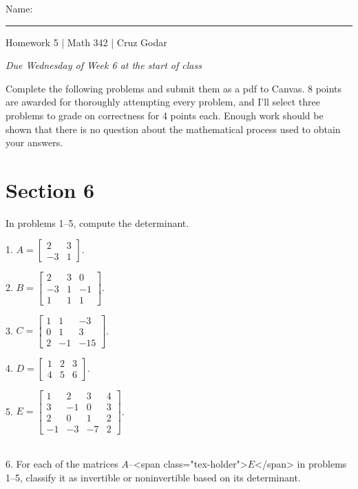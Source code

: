 \documentclass{article}
\begin{document}
\Large Name: \rule{2in}{0.15mm} \hfill Homework 5 | Math 342 | Cruz Godar \vspace{4pt} \normalsize

\textit{Due Wednesday of Week 6 at the start of class}

Complete the following problems and submit them as a pdf to Canvas. 8 points are awarded for thoroughly attempting every problem, and I'll select three problems to grade on correctness for 4 points each. Enough work should be shown that there is no question about the mathematical process used to obtain your answers.

\section{Section 6}

In problems 1--5, compute the determinant.

1. $\displaystyle A = \left[\begin{array}{cc} 2& 3 \\ -3& 1 \end{array}\right]$.

2. $\displaystyle B = \left[\begin{array}{ccc} 2& 3& 0 \\ -3& 1& -1 \\ 1& 1& 1 \end{array}\right]$.

3. $\displaystyle C = \left[\begin{array}{ccc} 1& 1& -3 \\ 0& 1& 3 \\ 2& -1& -15 \end{array}\right]$.

4. $\displaystyle D = \left[\begin{array}{ccc} 1& 2& 3 \\ 4& 5& 6 \end{array}\right]$.

5. $\displaystyle E = \left[\begin{array}{cccc} 1& 2& 3& 4 \\ 3& -1& 0& 3 \\ 2& 0& 1& 2\\ -1& -3& -7& 2 \end{array}\right]$.

~\\

6. For each of the matrices $A$--<span class="tex-holder">$E$</span> in problems 1--5, classify it as invertible or noninvertible based on its determinant.
\end{document}
